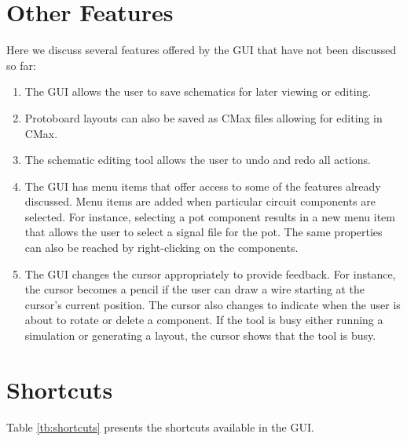 \section{Other Features}

Here we discuss several features offered by the GUI that have not been discussed
so far:

\begin{enumerate}
\item The GUI allows the user to save schematics for later viewing or editing.
\item Protoboard layouts can also be saved as CMax files allowing for editing
in CMax.
\item The schematic editing tool allows the user to undo and redo all actions.
\item The GUI has menu items that offer access to some of the features already
discussed. Menu items are added when particular circuit components are selected.
For instance, selecting a pot component results in a new menu item that allows
the user to select a signal file for the pot. The same properties can also be
reached by right-clicking on the components.
\item The GUI changes the cursor appropriately to provide feedback. For instance,
the cursor becomes
a pencil if the user can draw a wire starting at the cursor's current position.
The cursor also changes to indicate when the user is about to rotate or delete
a component. If the tool is busy either running a simulation or generating a
layout, the cursor shows that the tool is busy.
\end{enumerate}

\section{Shortcuts}
Table \ref{tb:shortcuts} presents the shortcuts available in the GUI.

